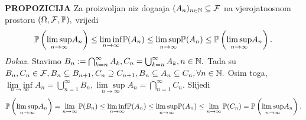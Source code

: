 \documentclass{article}
\newcommand{\mylimsup}{\underset{n\to\infty}{\lim\sup}}
\newcommand{\myliminf}{\underset{n\to\infty}{\lim\inf}}
\begin{document}
\textbf{PROPOZICIJA}\newline
Za proizvoljan niz doga\dj{}aja \((A_n)_{n\in\Bbb N}\subseteq\mathcal F\) na vjerojatnosnom prostoru \((\Omega,\mathcal F,\Bbb P),\) vrijedi \[\Bbb P\left(\mylimsup  A_n\right)\le\myliminf \Bbb P(A_n)\le\mylimsup \Bbb P(A_n)\le\Bbb P\left(\mylimsup A_n\right).\]
\textit{Dokaz.}\newline
Stavimo \(B_n:=\bigcap_{k=n}^\infty A_k,C_n=\bigcup_{k=n}^\infty A_k,n\in\Bbb N.\) Tada su \(B_n,C_n\in\mathcal F,B_n\subseteq B_{n+1},C_n\supseteq C_{n+1},B_n\subseteq A_n\subseteq C_n,\forall n\in\Bbb N.\) Osim toga, \(\myliminf A_n=\bigcup_{n=1}^\infty B_n,\mylimsup A_n=\bigcap_{n=1}^\infty C_n.\) Slijedi \[\Bbb P\left(\mylimsup  A_n\right)=\lim_{n\to\infty}\Bbb P(B_n)\le\myliminf \Bbb P(A_n)\le\mylimsup \Bbb P(A_n)\le\lim_{n\to\infty}\Bbb P(C_n)=\Bbb P\left(\mylimsup A_n\right).\]
\newpage
\end{document}
